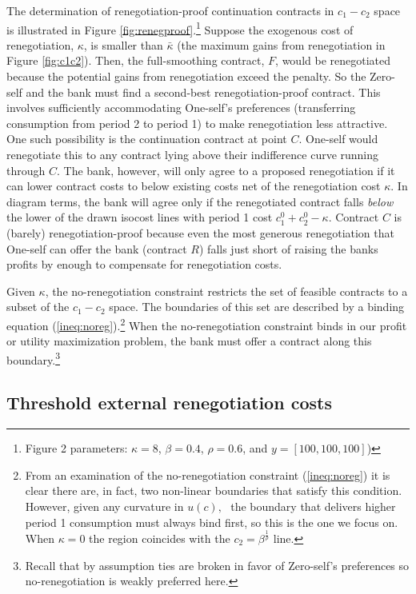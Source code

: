 \documentclass[11pt,english]{article}
\theoremstyle{plain}
\theoremstyle{definition}
\begin{document}
The determination of renegotiation-proof continuation contracts in $c_{1}-c_{2}$ space is illustrated in Figure \ref{fig:renegproof}.\footnote{Figure 2 parameters: $\kappa=8$, $\beta=0.4$, $\rho=0.6$, and $y=[100, 100, 100]$)} Suppose the exogenous cost of renegotiation, $\kappa$, is smaller than $\bar{\kappa}$ (the maximum gains from renegotiation in Figure \ref{fig:c1c2}). Then, the full-smoothing contract, $F$, would be renegotiated because the potential gains from renegotiation exceed the penalty.
So the Zero-self and the bank must find a second-best renegotiation-proof contract. This involves sufficiently accommodating One-self's preferences (transferring consumption from period 2 to period 1) to make renegotiation less attractive. One such possibility is the continuation contract at point $C$. One-self would renegotiate this to any contract lying above their indifference
curve running through $C$. The bank, however, will only agree to a proposed renegotiation if it can lower contract costs to below existing costs net of the renegotiation cost $\kappa.$ In diagram terms, the
bank will agree only if the renegotiated contract falls \textit{below} the lower of the drawn isocost lines with period 1 cost $c_{1}^{0}+c_{2}^{0}-\kappa$.
Contract $C$ is (barely) renegotiation-proof because even the most generous renegotiation that One-self can offer the bank (contract $R$) falls just short of raising the banks profits by enough to compensate for renegotiation costs.

Given $\kappa$, the no-renegotiation constraint restricts the set of feasible contracts to a subset of the $c_{1}-c_{2}$ space. The boundaries of this set are described by a binding equation (\ref{ineq:noreg}).\footnote{From  an examination of the no-renegotiation constraint
(\ref{ineq:noreg}) it is clear there are, in fact, two non-linear boundaries that satisfy this condition. However, given any curvature in \(u(c), \text{ } \)the boundary that delivers higher period 1 consumption must always bind first, so this is the one we focus on.
When $\kappa=0$ the region coincides with the $c_{2}=\beta^{\frac{1}{\rho}}$
line.} When the no-renegotiation
constraint binds in our profit or utility maximization problem, the
bank must offer a contract along this boundary.\footnote{Recall that by assumption ties are broken in favor of Zero-self's
preferences so no-renegotiation is weakly preferred here. } 


\subsection{Threshold external renegotiation costs }
\end{document}
